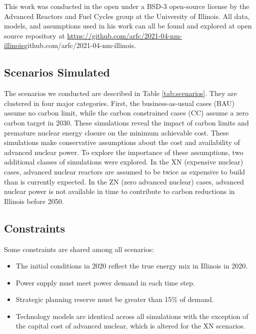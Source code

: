 This work was conducted in the open under a BSD-3 open-source license by the 
Advanced Reactors and Fuel Cycles group at the University of Illinois. All 
data, models, and assumptions used in his work can all be found and explored at 
open source repository at 
\url{https://github.com/arfc/2021-04-nm-illinois}{github.com/arfc/2021-04-nm-illinois}.

\FloatBarrier
\subsection{Scenarios Simulated}\label{sec:simulations}

The scenarios we conducted are described in Table \ref{tab:scenarios}.
They are clustered in four major categories. First, the business-as-usual cases 
(BAU) assume no carbon limit, while the carbon constrained cases (CC) assume a zero 
carbon target in 2030. 
These simulations reveal the impact of carbon limits and premature nuclear energy closure on 
the minimum achievable cost. These simulations make conservative assumptions 
about the cost and availability of advanced nuclear power. 
To explore the 
importance of these assumptions, two additional classes of simulations were 
explored. In the XN (expensive nuclear) cases, advanced nuclear reactors are 
assumed to be twice as expensive to build than is currently expected. In the ZN 
(zero advanced nuclear) cases, advanced nuclear power is not available in time 
to contribute to carbon reductions in Illinois before 2050.  






\FloatBarrier
\subsection{Constraints}
Some constraints are shared among all scenarios:
\begin{itemize}
        \item The initial conditions in 2020 reflect the true energy mix in Illinois in 2020.
        \item Power supply must meet power demand in each time step.
        \item Strategic planning reserve must be greater than 15\% of demand.
        \item Technology models are identical across all simulations with the exception of the capital cost of advanced nuclear, which is altered for the XN scenarios.  
\end{itemize}

